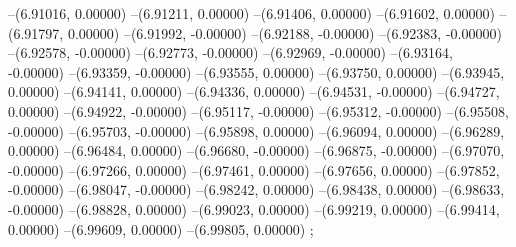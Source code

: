 --(6.91016, 0.00000)
--(6.91211, 0.00000)
--(6.91406, 0.00000)
--(6.91602, 0.00000)
--(6.91797, 0.00000)
--(6.91992, -0.00000)
--(6.92188, -0.00000)
--(6.92383, -0.00000)
--(6.92578, -0.00000)
--(6.92773, -0.00000)
--(6.92969, -0.00000)
--(6.93164, -0.00000)
--(6.93359, -0.00000)
--(6.93555, 0.00000)
--(6.93750, 0.00000)
--(6.93945, 0.00000)
--(6.94141, 0.00000)
--(6.94336, 0.00000)
--(6.94531, -0.00000)
--(6.94727, 0.00000)
--(6.94922, -0.00000)
--(6.95117, -0.00000)
--(6.95312, -0.00000)
--(6.95508, -0.00000)
--(6.95703, -0.00000)
--(6.95898, 0.00000)
--(6.96094, 0.00000)
--(6.96289, 0.00000)
--(6.96484, 0.00000)
--(6.96680, -0.00000)
--(6.96875, -0.00000)
--(6.97070, -0.00000)
--(6.97266, 0.00000)
--(6.97461, 0.00000)
--(6.97656, 0.00000)
--(6.97852, -0.00000)
--(6.98047, -0.00000)
--(6.98242, 0.00000)
--(6.98438, 0.00000)
--(6.98633, -0.00000)
--(6.98828, 0.00000)
--(6.99023, 0.00000)
--(6.99219, 0.00000)
--(6.99414, 0.00000)
--(6.99609, 0.00000)
--(6.99805, 0.00000)
;

